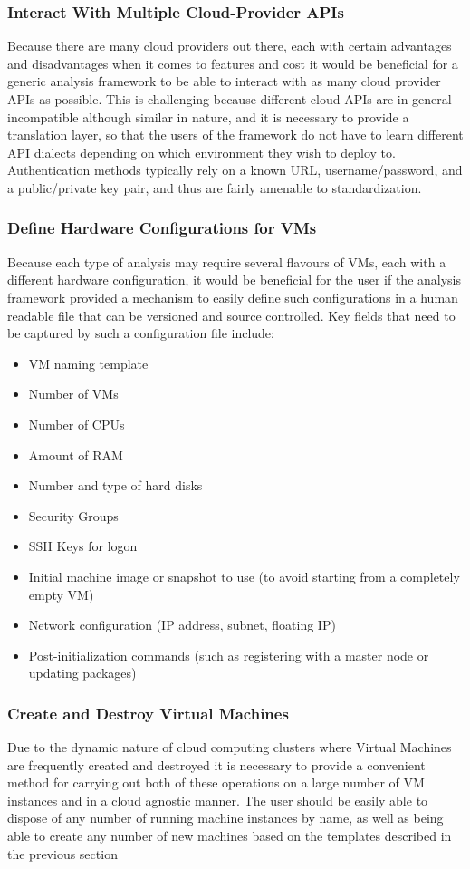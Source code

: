 \subsubsection{Interact With Multiple Cloud-Provider APIs}
Because there are many cloud providers out there, each with certain advantages and disadvantages when it comes to features and cost it would be beneficial for a generic analysis framework to be able to interact with as many cloud provider APIs as possible. This is challenging because different cloud APIs are in-general incompatible although similar in nature, and it is necessary to provide a translation layer, so that the users of the framework do not have to learn different API dialects depending on which environment they wish to deploy to. Authentication methods typically rely on a known URL, username/password, and a public/private key pair, and thus are fairly amenable to standardization.

\subsubsection{Define Hardware Configurations for VMs}
Because each type of analysis may require several flavours of VMs, each with a different hardware configuration, it would be beneficial for the user if the analysis framework provided a mechanism to easily define such configurations in a human readable file that can be versioned and source controlled. Key fields that need to be captured by such a configuration file include:

\begin{itemize}
\item VM naming template
\item Number of VMs
\item Number of CPUs
\item Amount of RAM
\item Number and type of hard disks
\item Security Groups
\item SSH Keys for logon
\item Initial machine image or snapshot to use (to avoid starting from a completely empty VM)
\item Network configuration (IP address, subnet, floating IP)
\item Post-initialization commands (such as registering with a master node or updating packages)
\end{itemize}

\subsubsection{Create and Destroy Virtual Machines}
Due to the dynamic nature of cloud computing clusters where Virtual Machines are frequently created and destroyed it is necessary to provide a convenient method for carrying out both of these operations on a large number of VM instances and in a cloud agnostic manner. The user should be easily able to dispose of any number of running machine instances by name, as well as being able to create any number of new machines based on the templates described in the previous section

